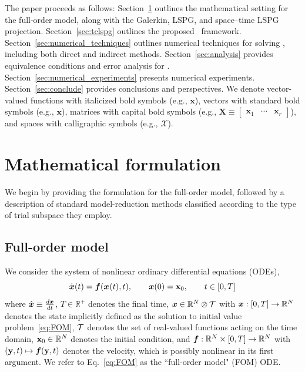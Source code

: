 \documentclass[3p,computermodern,10pt]{elsarticle}
\begin{document}
The paper proceeds as follows: Section~\ref{sec:math}
outlines the mathematical setting for the full-order model, along with the Galerkin, LSPG, and
space--time LSPG projection. Section~\ref{sec:tclspg} outlines the proposed \methodAcronym\
framework. Section~\ref{sec:numerical_techniques}
outlines numerical techniques for solving \methodAcronymROMs, including both direct and
indirect methods. Section~\ref{sec:analysis} provides
equivalence conditions and error analysis for \methodAcronymROMs.
Section~\ref{sec:numerical_experiments} presents numerical experiments.
Section~\ref{sec:conclude} provides conclusions and perspectives.
We denote vector-valued functions with italicized bold symbols (e.g., $\boldsymbol
x$), vectors with standard bold symbols (e.g., $\mathbf{x}$), 
matrices with capital bold symbols (e.g., $\mathbf{X} \equiv \begin{bmatrix}
\mathbf{x}_1 & \cdots & \mathbf{x}_r\end{bmatrix}$), and spaces with
calligraphic symbols (e.g., $\mathcal{X}$).
\section{Mathematical formulation}\label{sec:math}
	We begin by providing the formulation for the full-order model,
	followed by a description of standard model-reduction methods
	classified according to the type of trial subspace they employ.
	\subsection{Full-order model}\label{sec;FOM}
We consider the system of nonlinear ordinary differential equations (ODEs),
\begin{equation}\label{eq:FOM}
 \dot{{\boldsymbol x}}(t)  = \boldsymbol f({\boldsymbol x}^{}(t),t), \qquad {\boldsymbol x}(0) =
	{{\mathbf{x}}_0},\qquad t \in [0,T]
\end{equation}
where $\dot{{\boldsymbol x}} \equiv \frac{d {\boldsymbol x}}{dt}$, 
$T \in \mathbb{R}^+$ denotes the final time, ${\boldsymbol x} \in \mathbb{R}^{N}
	\otimes \mathcal{T} $ with ${\boldsymbol x}: [0,T] \rightarrow  \mathbb{R}^{N}$
	denotes the state implicitly defined as the solution to initial value
	problem~\eqref{eq:FOM}, 
	$\mathcal{T}$ denotes the set of real-valued functions acting on the time
	domain, 
 ${{\mathbf{x}}_0} \in \mathbb{R}^{N}$ denotes the initial condition,
	and $\boldsymbol f: \mathbb{R}^{N} \times [0,T] \rightarrow
	\mathbb{R}^{N}$ with $(\mathbf{y},t) \mapsto
	\boldsymbol f(\mathbf{y},t)$ denotes the velocity, which is possibly
	nonlinear in its first argument. We refer to Eq.~\eqref{eq:FOM} 
	as the ``full-order model" (FOM) ODE.
\end{document}

